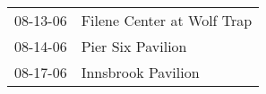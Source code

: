 \begin{supertabular}{p{0.25\columnwidth}p{0.75\columnwidth}}
 08-13-06 &  Filene Center at Wolf Trap \\
 08-14-06 &           Pier Six Pavilion \\
 08-17-06 &          Innsbrook Pavilion \\
\end{supertabular}
